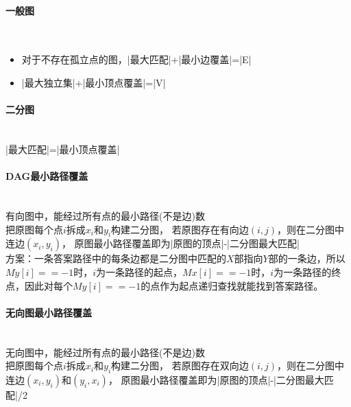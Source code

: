 \paragraph{一般图}~{}
\\
\begin{itemize}
\item 对于不存在孤立点的图，|最大匹配|+|最小边覆盖|=|E|
\item |最大独立集|+|最小顶点覆盖|=|V|
\end{itemize}

\paragraph{二分图}~{}
\\
|最大匹配|=|最小顶点覆盖|

\paragraph{DAG最小路径覆盖}~{}
\\
有向图中，能经过所有点的最小路径(不是边)数\\
把原图每个点$i$拆成$x_i$和$y_i$构建二分图，
若原图存在有向边$(i, j)$，则在二分图中连边$(x_i, y_i)$，
原图最小路径覆盖即为|原图的顶点|-|二分图最大匹配|\\
方案：一条答案路径中的每条边都是二分图中匹配的$X$部指向$Y$部的一条边，所以$My[i]==-1$时，$i$为一条路径的起点，$Mx[i]==-1$时，$i$为一条路径的终点，因此对每个$My[i]==-1$的点作为起点递归查找就能找到答案路径。

\paragraph{无向图最小路径覆盖}~{}
\\
无向图中，能经过所有点的最小路径(不是边)数\\
把原图每个点$i$拆成$x_i$和$y_i$构建二分图，
若原图存在双向边$(i, j)$，则在二分图中连边$(x_i, y_i)$和$(y_i, x_i)$，
原图最小路径覆盖即为|原图的顶点|-|二分图最大匹配|/2